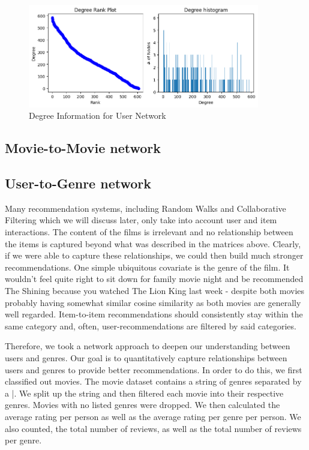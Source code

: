\documentclass[12pt]{article}
\numberwithin{equation}{section}
\begin{document}
\begin{figure}[h!]
    \begin{minipage}[b]{01\linewidth}
         \centering
  	\includegraphics[width=0.9\textwidth]{UN_degreeinfo.png}
  	\caption{Degree Information for User Network}
  	\label{fig:UN_degreeinfo}
    \end{minipage}
\end{figure}

\subsection{Movie-to-Movie network}

\subsection{User-to-Genre network}

Many recommendation systems, including Random Walks and Collaborative Filtering which we will discuss later, only take into account user and item interactions. The content of the films is irrelevant and no relationship between the items is captured beyond what was described in the matrices above. Clearly, if we were able to capture these relationships, we could then build much stronger recommendations. One simple ubiquitous covariate is the genre of the film. It wouldn't feel quite right to sit down for family movie night and be recommended The Shining because you watched The Lion King last week - despite both movies probably having somewhat similar cosine similarity as both movies are generally well regarded. Item-to-item recommendations should consistently stay within the same category and, often, user-recommendations are filtered by said categories.

Therefore, we took a network approach to deepen our understanding between users and genres. Our goal is to quantitatively capture relationships between users and genres to provide better recommendations. In order to do this, we first classified out movies. The movie dataset contains a string of genres separated by a |. We split up the string and then filtered each movie into their respective genres. Movies with no listed genres were dropped. We then calculated the average rating per person as well as the average rating per genre per person. We also counted, the total number of reviews, as well as the total number of reviews per genre. 
\end{document}
